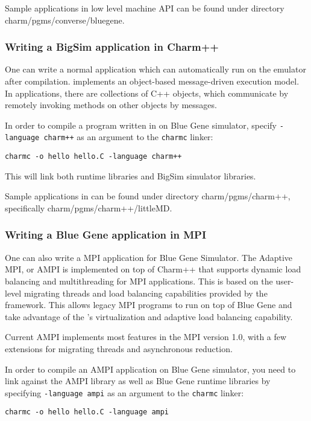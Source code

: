 Sample applications in low level machine API can be found under directory
charm/pgms/converse/bluegene.

\subsubsection{Writing a BigSim application in Charm++}

One can write a normal \charmpp{} application which can automatically 
run on the emulator after compilation. \charmpp{} implements
an object-based message-driven execution model. In \charmpp{} applications,
there are collections of C++ objects, which communicate by remotely invoking
methods on other objects by messages.

In order to compile a program written in \charmpp{} on Blue Gene simulator, 
specify \texttt{-language charm++} as an argument to the {\tt charmc} linker:
\begin{verbatim}
charmc -o hello hello.C -language charm++
\end{verbatim}
This will link both \charmpp{} runtime libraries and BigSim simulator 
libraries.

Sample applications in \charmpp{} can be found under directory
charm/pgms/charm++, specifically charm/pgms/charm++/littleMD.

\subsubsection{Writing a Blue Gene application in MPI}

One can also write a MPI application for Blue Gene Simulator.
The Adaptive MPI, or AMPI is implemented on top of Charm++ that supports
dynamic load balancing and multithreading for MPI applications. This is based
on the user-level migrating threads and load balancing capabilities provided
by the \charmpp{} framework. This allows legacy MPI programs to run 
on top of Blue Gene \charmpp{} and take advantage of the \charmpp{}'s
virtualization and adaptive load balancing capability.

Current AMPI implements most features in the MPI version 1.0, with a few
extensions for migrating threads and asynchronous reduction.

In order to compile an AMPI application on Blue Gene simulator, you need 
to link against the AMPI library as well as Blue Gene \charmpp{} runtime
libraries by specifying \texttt{-language ampi} as an argument to 
the {\tt charmc} linker:
\begin{verbatim}
charmc -o hello hello.C -language ampi
\end{verbatim}

